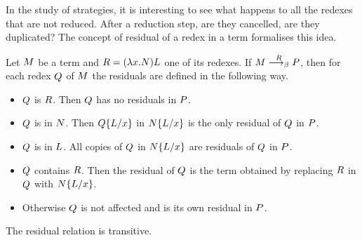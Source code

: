 \begin{THESIS}
	In the study of strategies, it is interesting to see what happens to all the redexes that are not reduced. After a reduction step, are they cancelled, are they duplicated? The concept of residual of a redex in a term formalises this idea.
	\begin{definition}
		Let $M$ be a term and $R=(\lambda x.N)L$ one of its redexes. If $M\overset{R}{\longrightarrow_\beta}P$, then for each redex $Q$ of $M$ the residuals are defined in the following way.
		\begin{itemize}
			\item $Q$ is $R$. Then $Q$ has no residuals in $P$.
			\item $Q$ is in $N$. Then $Q\{L/x\}$ in $N\{L/x\}$ is the only residual of $Q$ in $P$.
			\item $Q$ is in $L$. All copies of $Q$ in $N\{L/x\}$ are residuals of $Q$ in $P$.
			\item $Q$ contains $R$. Then the residual of $Q$ is the term obtained by replacing $R$ in $Q$ with $N\{L/x\}$.
			\item Otherwise $Q$ is not affected and is its own residual in $P$.
		\end{itemize}
		The residual relation is transitive.
	\end{definition}

\end{THESIS}

